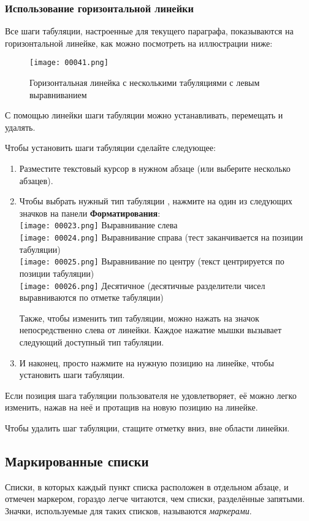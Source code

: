 \documentclass[a4paper,10pt]{article}
\begin{document}
\subsubsection{Использование горизонтальной линейки}
Все шаги табуляции, настроенные для текущего параграфа, показываются на горизонтальной линейке, как можно посмотреть на иллюстрации ниже:

\begin{figure}[ht]
\texttt{[image: 00041.png]}
\centering
\caption{Горизонтальная линейка с несколькими табуляциями с левым выравниванием}
\end{figure}

С помощью линейки шаги табуляции можно устанавливать, перемещать и удалять.

Чтобы установить шаги табуляции сделайте следующее:
\begin{enumerate}
 \item Разместите текстовый курсор в нужном абзаце (или выберите несколько абзацев).
 \item Чтобы выбрать нужный тип табуляции , нажмите на один из следующих значков на панели \textbf{Форматирования}:\\
 \texttt{[image: 00023.png]} Выравнивание слева\\
 \texttt{[image: 00024.png]} Выравнивание справа (тест заканчивается на позиции табуляции)\\
 \texttt{[image: 00025.png]} Выравнивание по центру (текст центрируется по позиции табуляции)\\
 \texttt{[image: 00026.png]} Десятичное (десятичные разделители чисел выравниваются по отметке табуляции)
 
 Также, чтобы изменить тип табуляции, можно нажать на значок непосредственно слева от линейки. Каждое нажатие мышки вызывает следующий доступный тип табуляции.
 \item И наконец, просто нажмите на нужную позицию на линейке, чтобы установить шаги табуляции.
\end{enumerate}

Если позиция шага табуляции пользователя не удовлетворяет, её можно легко изменить, нажав на неё и протащив на новую позицию на линейке.

Чтобы удалить шаг табуляции, стащите отметку вниз, вне области линейки.

\subsection{Маркированные списки}
Списки, в которых каждый пункт списка расположен в отдельном абзаце, и отмечен маркером, гораздо легче читаются, чем списки, разделённые запятыми. Значки, используемые для таких списков, называются \textit{маркерами}.
\end{document}
